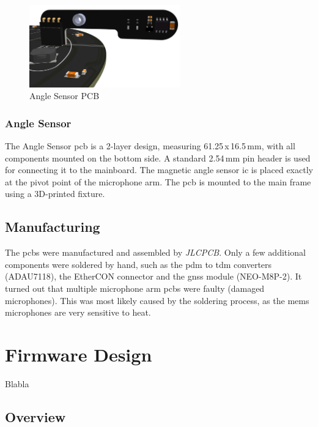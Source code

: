 \begin{minipage}{\linewidth}
	\begin{figure}
		\vspace{0.2cm}
		\includegraphics[width=6.5cm]{images/6_design_final/Angle_Sensor_Front.png}
		\centering
		\caption{Angle Sensor PCB}
		\label{fig:angle_sensor_pcb}
	\end{figure}
	\subsubsection{Angle Sensor}
	The Angle Sensor \acrshort{pcb} is a 2-layer design, measuring 61.25\,x\,16.5\,mm, with all components mounted on the bottom side.
	A standard 2.54\,mm pin header is used for connecting it to the mainboard.
	The magnetic angle sensor \acrshort{ic} is placed exactly at the pivot point of the microphone arm.
	The \acrshort{pcb} is mounted to the main frame using a 3D-printed fixture.
\end{minipage}

\subsection{Manufacturing}
The \acrshort{pcb}s were manufactured and assembled by \textit{JLCPCB}.
Only a few additional components were soldered by hand, such as the \acrshort{pdm} to \acrshort{tdm} converters (ADAU7118), the EtherCON connector and the \acrshort{gnss} module (NEO-M8P-2).
It turned out that multiple microphone arm \acrshort{pcb}s were faulty (damaged microphones).
This was most likely caused by the soldering process, as the \acrshort{mems} microphones are very sensitive to heat.

\newpage
\section{Firmware Design}
Blabla

\subsection{Overview}

